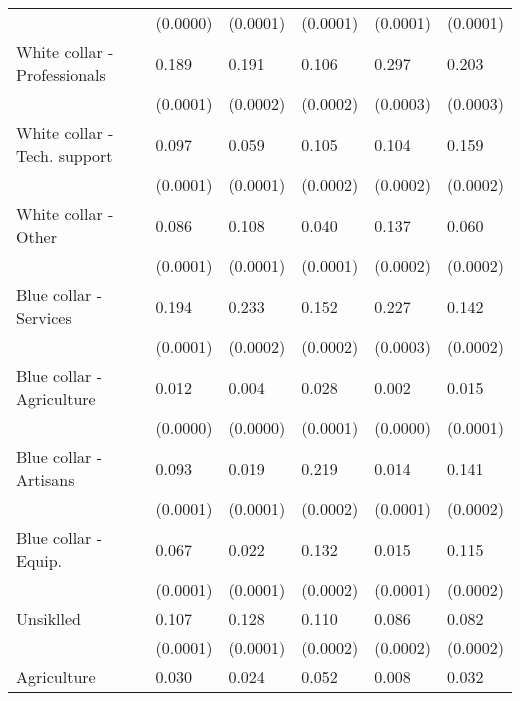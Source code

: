 \begin{tabular}{llllll}
                             &  (0.0000) &  (0.0001) &  (0.0001) &           (0.0001) &         (0.0001) \\
White collar - Professionals &     0.189 &     0.191 &     0.106 &              0.297 &            0.203 \\
                             &  (0.0001) &  (0.0002) &  (0.0002) &           (0.0003) &         (0.0003) \\
White collar - Tech. support &     0.097 &     0.059 &     0.105 &              0.104 &            0.159 \\
                             &  (0.0001) &  (0.0001) &  (0.0002) &           (0.0002) &         (0.0002) \\
White collar - Other         &     0.086 &     0.108 &     0.040 &              0.137 &            0.060 \\
                             &  (0.0001) &  (0.0001) &  (0.0001) &           (0.0002) &         (0.0002) \\
Blue collar - Services       &     0.194 &     0.233 &     0.152 &              0.227 &            0.142 \\
                             &  (0.0001) &  (0.0002) &  (0.0002) &           (0.0003) &         (0.0002) \\
Blue collar - Agriculture    &     0.012 &     0.004 &     0.028 &              0.002 &            0.015 \\
                             &  (0.0000) &  (0.0000) &  (0.0001) &           (0.0000) &         (0.0001) \\
Blue collar - Artisans       &     0.093 &     0.019 &     0.219 &              0.014 &            0.141 \\
                             &  (0.0001) &  (0.0001) &  (0.0002) &           (0.0001) &         (0.0002) \\
Blue collar - Equip.         &     0.067 &     0.022 &     0.132 &              0.015 &            0.115 \\
                             &  (0.0001) &  (0.0001) &  (0.0002) &           (0.0001) &         (0.0002) \\
Unsiklled                    &     0.107 &     0.128 &     0.110 &              0.086 &            0.082 \\
                             &  (0.0001) &  (0.0001) &  (0.0002) &           (0.0002) &         (0.0002) \\
Agriculture                  &     0.030 &     0.024 &     0.052 &              0.008 &            0.032 \\

\end{tabular}
